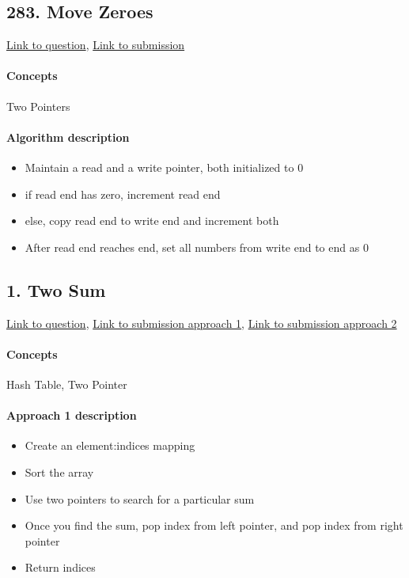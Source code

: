 \documentclass[11pt]{book}
\begin{document}
\subsection{283. Move Zeroes}
\href{https://leetcode.com/problems/move-zeroes/}{Link to question},
\href{https://leetcode.com/submissions/detail/333138944/}{Link to submission}
\paragraph{Concepts}
Two Pointers
\paragraph{Algorithm description}
\begin{itemize}
    \item Maintain a read and a write pointer, both initialized to 0
    \item if read end has zero, increment read end
    \item else, copy read end to write end and increment both
    \item After read end reaches end, set all numbers from write end to end as 0
\end{itemize}

\subsection{1. Two Sum}
\href{https://leetcode.com/problems/two-sum/}{Link to question},
\href{https://leetcode.com/submissions/detail/333142473/}{Link to submission approach 1},
\href{https://leetcode.com/submissions/detail/333144602/}{Link to submission approach 2}
\paragraph{Concepts}
Hash Table, Two Pointer
\paragraph{Approach 1 description}
\begin{itemize}
    \item Create an element:indices mapping
    \item Sort the array
    \item Use two pointers to search for a particular sum
    \item Once you find the sum, pop index from left pointer, and pop index from right pointer
    \item Return indices
\end{itemize}
\end{document}

